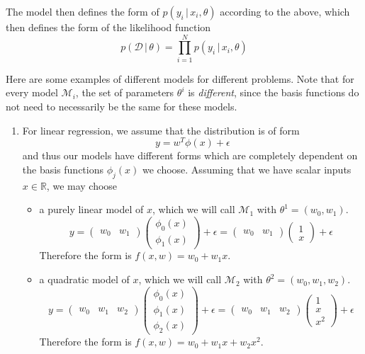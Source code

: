   The model then defines the form of $p(y_i\,|\,x_i, \theta)$ according to the above, which then defines the form of the likelihood function
  \begin{equation}
    p(\mathcal{D}\,|\,\theta) = \prod_{i=1}^N p(y_i\,|\,x_i, \theta)
  \end{equation}

  Here are some examples of different models for different problems. Note that for every model $\mathcal{M}_i$, the set of parameters $\theta^i$ is \textit{different}, since the basis functions do not need to necessarily be the same for these models.

  \begin{enumerate}
    \item For linear regression, we assume that the distribution is of form
    \begin{equation}
      y = w^T \phi(x) + \epsilon
    \end{equation}
    and thus our models have different forms which are completely dependent on the basis functions $\phi_j(x)$ we choose. Assuming that we have scalar inputs $x \in \mathbb{R}$, we may choose
    \begin{itemize}
      \item a purely linear model of $x$, which we will call $\mathcal{M}_1$ with $\theta^1 = (w_0, w_1)$.
      \begin{equation}
        y = \begin{pmatrix} w_0 & w_1 \end{pmatrix} \begin{pmatrix} \phi_0 (x) \\ \phi_1 (x) \end{pmatrix} + \epsilon = \begin{pmatrix} w_0 & w_1 \end{pmatrix} \begin{pmatrix} 1 \\ x \end{pmatrix} + \epsilon
      \end{equation}
      Therefore the form is $f(x, w) = w_0 + w_1 x$.

      \item a quadratic model of $x$, which we will call $\mathcal{M}_2$ with $\theta^2 = (w_0, w_1, w_2)$.
      \begin{equation}
        y = \begin{pmatrix} w_0 & w_1 & w_2 \end{pmatrix} \begin{pmatrix} \phi_0 (x) \\ \phi_1 (x) \\ \phi_2 (x) \end{pmatrix} + \epsilon = \begin{pmatrix} w_0 & w_1 & w_2 \end{pmatrix} \begin{pmatrix} 1 \\ x \\ x^2 \end{pmatrix} + \epsilon
      \end{equation}
      Therefore the form is $f(x, w) = w_0 + w_1 x + w_2 x^2$.


\end{itemize}
\end{enumerate}
